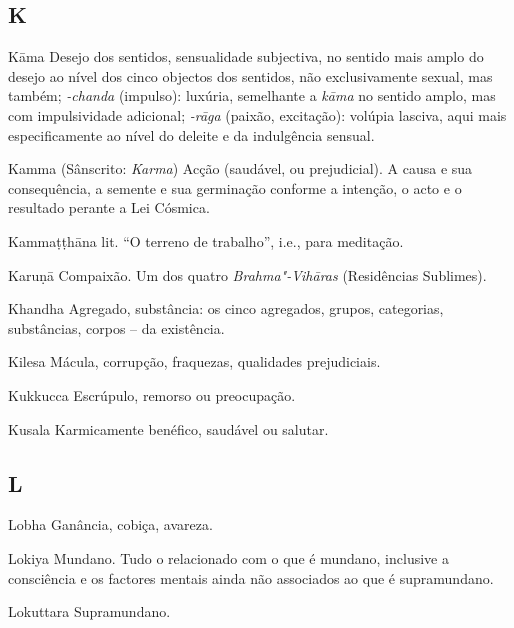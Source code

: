 \subsection{K}

\begin{glossarydescription}

\item[Kāma] Desejo dos sentidos, sensualidade subjectiva, no sentido mais
amplo do desejo ao nível dos cinco objectos dos sentidos, não exclusivamente
sexual, mas também; \emph{-chanda} (impulso): luxúria, semelhante a
\emph{kāma} no sentido amplo, mas com impulsividade adicional; \emph{-rāga}
(paixão, excitação): volúpia lasciva, aqui mais especificamente ao nível do
deleite e da indulgência sensual.

\item[Kamma] (Sânscrito: \emph{Karma}) Acção (saudável, ou prejudicial). A causa
e sua consequência, a semente e sua germinação conforme a intenção, o acto e o
resultado perante a Lei Cósmica.

\item[Kammaṭṭhāna] lit. “O terreno de trabalho”, i.e., para meditação.

\item[Karuṇā] Compaixão. Um dos quatro \emph{Brahma"-Vihāras} (Residências Sublimes).

\item[Khandha] Agregado, substância: os cinco agregados, grupos, categorias,
substâncias, corpos -- da existência.

\item[Kilesa] Mácula, corrupção, fraquezas, qualidades prejudiciais.

\item[Kukkucca] Escrúpulo, remorso ou preocupação.

\item[Kusala] Karmicamente benéfico, saudável ou salutar.

\end{glossarydescription}

\subsection{L}

\begin{glossarydescription}

\item[Lobha] Ganância, cobiça, avareza.

\item[Lokiya] Mundano. Tudo o relacionado com o que é mundano, inclusive a
consciência e os factores mentais ainda não associados ao que é supramundano.

\item[Lokuttara] Supramundano.

\end{glossarydescription}

